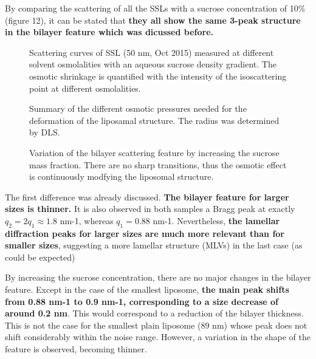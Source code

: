 By comparing the scattering of all the SSLs with a sucrose concentration of 10$\%$ (figure 12), it can be stated that \textbf{they all show the same 3-peak structure in the bilayer feature which was dicussed before.}

\begin{figure}
	\centering
		\caption{Scattering curves of SSL (50 nm, Oct 2015) measured at different solvent osmolalities with an aqueous sucrose density gradient. The osmotic shrinkage is quantified with the intensity of the isoscattering point at different osmolalities.}
\end{figure}

\begin{figure}
	\centering
		\subfloat[SSL 200 nm]{\resizebox{0.44\linewidth}{!}{}\label{fig:SSLContrastCurvesBilayer200SSL}}
		\subfloat[Plain 100 nm]{\resizebox{0.44\linewidth}{!}{}\label{fig:SSLContrastCurvesBilayer100Plain}}
		\caption{Summary of the different osmotic pressures needed for the deformation of the liposamal structure. The radius was determined by DLS.}
\end{figure}

\begin{figure}
	\centering
		
		\caption{Variation of the bilayer scattering feature by increasing the sucrose mass fraction. There are no sharp transitions, thus the osmotic effect is continuously modfying the liposomal structure.}
		\label{fig:SSLContrastVariationChiSquared400SSL}
\end{figure}

The first difference was already discussed. \textbf{The bilayer feature for larger sizes is thinner.} It is also observed in both samples a Bragg peak at exactly $q_2=2q_1\approx1.8$ nm-1, whereas $q_1=0.88$ nm-1. Nevertheless, \textbf{the lamellar diffraction peaks for larger sizes are much more relevant than for smaller sizes}, suggesting a more lamellar structure (MLVs) in the last case (as could be expected)

By increasing the sucrose concentration, there are no major changes in the bilayer feature. Except in the case of the smallest liposome, \textbf{the main peak shifts from 0.88 nm-1 to 0.9 nm-1, corresponding to a size decrease of around 0.2 nm}. This would correspond to a reduction of the bilayer thickness. This is not the case for the smallest plain liposome (89 nm) whose peak does not shift considerably within the noise range. However, a variation in the shape of the feature is observed, becoming thinner.

